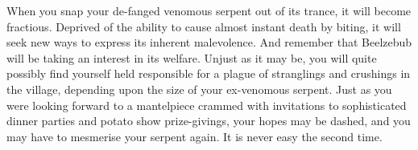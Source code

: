 When you snap your de-fanged venomous serpent out of its trance, it will become fractious. Deprived of the ability to cause almost instant death by biting, it will seek new ways to express its inherent malevolence. And remember that Beelzebub will be taking an interest in its welfare. Unjust as it may be, you will quite possibly find yourself held responsible for a plague of stranglings and crushings in the village, depending upon the size of your ex-venomous serpent. Just as you were looking forward to a mantelpiece crammed with invitations to sophisticated dinner parties and potato show prize-givings, your hopes may be dashed, and you may have to mesmerise your serpent again. It is never easy the second time.